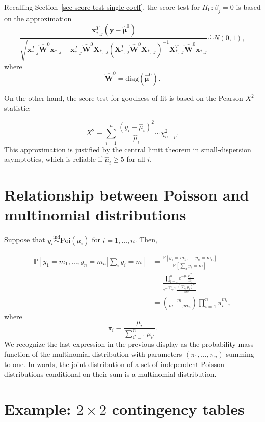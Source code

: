 \documentclass[
  11pt,
  letterpaper,
  oneside]{book}
\theoremstyle{plain}
\theoremstyle{plain}
\theoremstyle{definition}
\theoremstyle{definition}
\theoremstyle{plain}
\theoremstyle{remark}
\begin{document}
Recalling Section~\ref{sec-score-test-single-coeff}, the score test for
\(H_0: \beta_j = 0\) is based on the approximation \[
\frac{\boldsymbol{x}_{*,j}^T (\boldsymbol{y} - \boldsymbol{\widehat{\mu}}^0)}{\sqrt{\boldsymbol x_{*,j}^T \boldsymbol {\widehat W}^{0}\boldsymbol x_{*,j} - \boldsymbol x_{*,j}^T \boldsymbol {\widehat W}^{0}\boldsymbol X_{*,\text{-}j}(\boldsymbol X_{*,\text{-}j}^T \boldsymbol {\widehat W}^{0}\boldsymbol X_{*,\text{-}j})^{-1}\boldsymbol X_{*,\text{-}j}^T \boldsymbol {\widehat W}^{0}\boldsymbol x_{*,j}}} \overset{\cdot}\sim N(0,1),
\] where \[
\boldsymbol {\widehat W}^{0} = \text{diag}(\boldsymbol{\widehat{\mu}}^0).
\]

On the other hand, the score test for goodness-of-fit is based on the
Pearson \(X^2\) statistic:

\[
X^2 \equiv \sum_{i = 1}^n \frac{(y_i - \hat \mu_i)^2}{\hat \mu_i} \overset{\cdot}\sim \chi^2_{n - p}.
\] This approximation is justified by the central limit theorem in
small-dispersion asymptotics, which is reliable if \(\hat \mu_i \geq 5\)
for all \(i\).

\hypertarget{sec-poisson-multinomial}{%
\section{Relationship between Poisson and multinomial
distributions}\label{sec-poisson-multinomial}}

Suppose that \(y_i \overset{\text{ind}}\sim \text{Poi}(\mu_i)\) for
\(i = 1, \dots, n\). Then,

\[
\begin{split}
\mathbb{P}\left[y_1 = m_1, \dots, y_n = m_n \left| \sum_{i}y_i = m\right.\right] &= \frac{\mathbb{P}[y_1 = m_1, \dots, y_n = m_n]}{\mathbb{P}[\sum_{i}y_i = m]} \\
&= \frac{\prod_{i = 1}^n e^{-\mu_i}\frac{\mu_i^{m_i}}{m_i!}}{e^{-\sum_i \mu_i}\frac{(\sum_i \mu_i)^m}{m!}} \\
&= {m \choose m_1, \dots, m_n} \prod_{i = 1}^n \pi_i^{m_i},
\end{split}
\] where \[
\pi_i \equiv \frac{\mu_i}{\sum_{i' = 1}^n \mu_{i'}}.
\] We recognize the last expression in the previous display as the
probability mass function of the multinomial distribution with
parameters \((\pi_1, \dots, \pi_n)\) summing to one. In words, the joint
distribution of a set of independent Poisson distributions conditional
on their sum is a multinomial distribution.

\hypertarget{sec-example-2x2-tables}{%
\section{\texorpdfstring{Example: \(2 \times 2\) contingency
tables}{Example: 2 \textbackslash times 2 contingency tables}}\label{sec-example-2x2-tables}}
\end{document}
